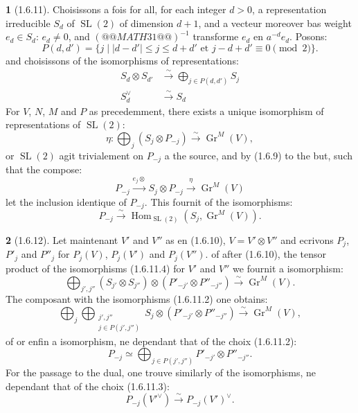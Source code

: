 \documentclass[12pt,a4paper]{article}
\theoremstyle{plain}
\theoremstyle{definition}
\theoremstyle{definition}
\newtheorem{para}{}[section]
\theoremstyle{remark}
\DeclareMathOperator{\Gr}{Gr}
\DeclareMathOperator{\Hom}{Hom}
\DeclareMathOperator{\SL}{SL}
\begin{document}
\begin{para}[1.6.11]
Choisissons a fois for all, for each integer $d > 0$, a representation irreducible $S_d$ of $\SL(2)$ of dimension $d+1$, and a vecteur moreover bas weight $e_d \in S_d$: $e_d \neq 0$, and $(@@MATH31@@)^{-1}$ transforme $e_d$ en $a^{-d} e_d$. Posons:
\[P(d, d') = \{j \mid |d-d'| \leq j \leq d+d' \text{ et } j - d + d' \equiv 0 \pmod{2}\}.\]
and choisissons of the isomorphisms of representations:
\begin{align}
S_d \otimes S_{d'} &\xrightarrow{\sim} \bigoplus_{j \in P(d,d')} S_j \tag{1.6.11.2}\\
S_d^\vee &\xrightarrow{\sim} S_d \tag{1.6.11.3}
\end{align}
For $V$, $N$, $M$ and $P$ as precedemment, there exists a unique isomorphism of representations of $\SL(2)$:
\begin{equation}\tag{1.6.11.4}
\eta: \bigoplus_j (S_j \otimes P_{-j}) \xrightarrow{\sim} \Gr^M(V),
\end{equation}
or $\SL(2)$ agit trivialement on $P_{-j}$ a the source, and by (1.6.9) to the but, such that the compose:
\[P_{-j} \xrightarrow{e_j \otimes} S_j \otimes P_{-j} \xrightarrow{\eta} \Gr^M(V)\]
let the inclusion identique of $P_{-j}$. This fournit of the isomorphisms:
\begin{equation}\tag{1.6.11.5}
P_{-j} \xrightarrow{\sim} \Hom_{\SL(2)}(S_j, \Gr^M(V)).
\end{equation}
\end{para}

\begin{para}[1.6.12]
Let maintenant $V'$ and $V''$ as en (1.6.10), $V = V' \otimes V''$ and ecrivons $P_j$, $P'_j$ and $P''_j$ for $P_j(V)$, $P_j(V')$ and $P_j(V'')$. of after (1.6.10), the tensor product of the isomorphisms (1.6.11.4) for $V'$ and $V''$ we fournit a isomorphism:
\[\bigoplus_{j', j''} (S_{j'} \otimes S_{j''}) \otimes (P'_{-j'} \otimes P''_{-j''}) \xrightarrow{\sim} \Gr^M(V).\]
The composant with the isomorphisms (1.6.11.2) one obtains:
\[\bigoplus_j \bigoplus_{\substack{j', j'' \\ j \in P(j',j'')}} S_j \otimes (P'_{-j'} \otimes P''_{-j''}) \xrightarrow{\sim} \Gr^M(V),\]
of or enfin a isomorphism, ne dependant that of the choix (1.6.11.2):
\begin{equation}\tag{1.6.12.1}
P_{-j} \simeq \bigoplus_{j \in P(j',j'')} P'_{-j'} \otimes P''_{-j''}.
\end{equation}
For the passage to the dual, one trouve similarly of the isomorphisms, ne dependant that of the choix (1.6.11.3):
\begin{equation}\tag{1.6.12.2}
P_{-j}(V'^\vee) \xrightarrow{\sim} P_{-j}(V')^\vee.
\end{equation}
\end{para}
\end{document}
